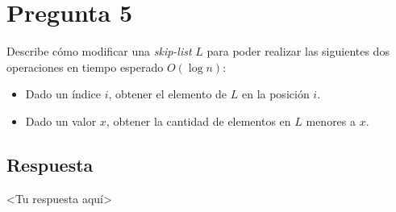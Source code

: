 \section*{Pregunta 5}
\noindent Describe cómo modificar una \textit{skip-list} $L$ para poder realizar las siguientes dos operaciones en tiempo esperado $O(\log n)$:
  \begin{itemize}
  \item Dado un índice $i$, obtener el elemento de $L$ en la posición $i$.
  \item Dado un valor $x$, obtener la cantidad de elementos en $L$ menores a $x$.
  \end{itemize}

\subsection*{Respuesta}
    <Tu respuesta aquí>

\bigskip
